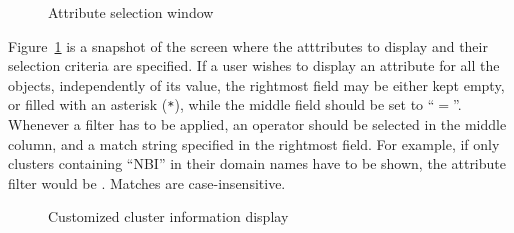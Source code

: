 \documentclass{article}
\begin{document}
\begin{figure}[hb]
  \caption{\label{fig:match2}Attribute selection window}
\end{figure}

Figure~\ref{fig:match2} is a snapshot of the screen where the
atttributes to display and their selection criteria are specified. If
a user wishes to display an attribute for all the objects,
independently of its value, the rightmost field may be either kept
empty, or filled with an asterisk (\verb#*#), while the middle field
should be set to ``$=$''. Whenever a filter has to be applied, an
operator should be selected in the middle column, and a match string
specified in the rightmost field. For example, if only clusters
containing ``NBI'' in their domain names have to be shown, the
attribute filter would be . Matches are case-insensitive.

 \begin{figure}[ht]
   \caption{\label{fig:match3}Customized cluster information display}
 \end{figure}
\end{document}
